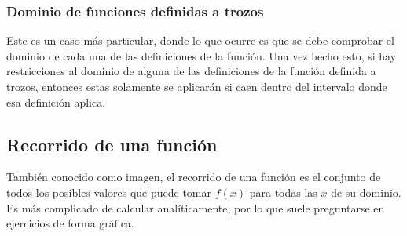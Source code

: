 \documentclass[sans]{apuntes}
\begin{document}
\subsubsection{Dominio de funciones definidas a trozos}
Este es un caso más particular, donde lo que ocurre es que se debe comprobar el dominio de cada una de las definiciones de la función. Una vez hecho esto, si hay restricciones al dominio de alguna de las definiciones de la función definida a trozos, entonces estas solamente se aplicarán si caen dentro del intervalo donde esa definición aplica.

\subsection{Recorrido de una función} %
También conocido como imagen, el recorrido de una función es el conjunto de todos los posibles valores que puede tomar $f(x)$ para todas las $x$ de su dominio. Es más complicado de calcular analíticamente, por lo que suele preguntarse en ejercicios de forma gráfica.
\end{document}
